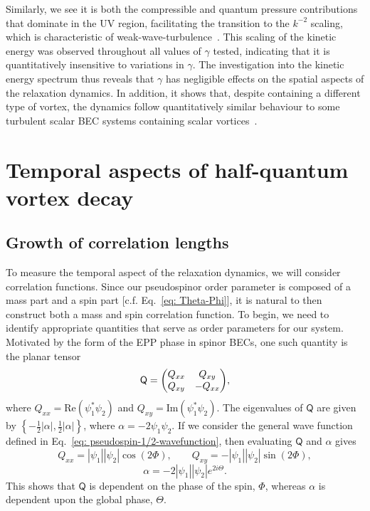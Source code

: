 Similarly, we see it is both the compressible and quantum pressure contributions
that dominate in the UV region, facilitating the transition to the \(k^{-2}\)
scaling, which is characteristic of weak-wave-turbulence~\cite{Zakharov1992,
Nazarenko2011, Newell2011}.
This scaling of the kinetic energy was observed throughout all values of
\(\gamma \) tested, indicating that it is quantitatively insensitive to
variations in \(\gamma \).
The investigation into the kinetic energy spectrum thus reveals that \(\gamma \)
has negligible effects on the spatial aspects of the relaxation dynamics.
In addition, it shows that, despite containing a different type of vortex, the
dynamics follow quantitatively similar behaviour to some turbulent scalar BEC
systems containing scalar vortices~\cite{Nowak2012}.

\section{Temporal aspects of half-quantum vortex decay}
\subsection{Growth of correlation lengths}
To measure the temporal aspect of the relaxation dynamics, we will consider
correlation functions.
Since our pseudospinor order parameter is composed of a mass part and a spin
part [c.f. Eq.~\eqref{eq: Theta-Phi}], it is natural to then construct both a
mass and spin correlation function.
To begin, we need to identify appropriate quantities that serve as order
parameters for our system.
Motivated by the form of the EPP phase in spinor BECs, one such quantity is
the planar tensor~\cite{Symes2017}
\begin{equation}
    \mathsf{Q} = \mqty(Q_{xx} & Q_{xy} \\ Q_{xy} & -Q_{xx}),
\end{equation}
where \(Q_{xx} = \mathrm{Re}(\psi_1^*\psi_2)\) and
\(Q_{xy} = \mathrm{Im}(\psi_1^*\psi_2)\).
The eigenvalues of \(\mathsf{Q}\) are given by
\( \left\{-\frac{1}{2}|\alpha|, \frac{1}{2}|\alpha|\right\} \), where
\(\alpha=-2\psi_1\psi_2\).
If we consider the general wave function defined in
Eq.~\eqref{eq: pseudospin-1/2-wavefunction}, then evaluating \(\mathsf{Q}\) and
\(\alpha \) gives
\begin{equation}
    Q_{xx} = |\psi_1||\psi_2|\cos({2\Phi}), \qquad
    Q_{xy} = -|\psi_1||\psi_2|\sin({2\Phi}),
\end{equation}
\begin{equation}
    \alpha = -2|\psi_1||\psi_2|e^{2i\Theta}.
\end{equation}
This shows that \(\mathsf{Q}\) is dependent on the phase of the spin,
\( \Phi \), whereas \(\alpha \) is dependent upon the global phase,
\( \Theta \).


